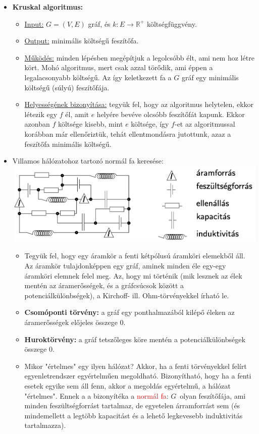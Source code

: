 \documentclass[../../szobeli.tex]{subfiles}
\begin{document}
\begin{itemize}
        \item \textbf{Kruskal algoritmus:} \begin{itemize}
            \item \underline{Input:} $G=(V,E)$ gráf, és $k:E\rightarrow \mathbb{R}^+$ költségfüggvény.
            \item \underline{Output:} minimális költségű feszítőfa.
            \item \underline{Működés:} minden lépésben megépítjuk a legolcsóbb élt, ami nem hoz létre kört. Mohó algoritmus, mert csak azzal törődik, ami éppen a legalacsonyabb költségű. Az így keletkezett fa a $G$ gráf egy minimális költségű (súlyú) feszítőfája.
            \item \underline{Helyességének bizonyítása:} tegyük fel, hogy az algoritmus helytelen, ekkor létezik egy $f$ él, amit $e$ helyére bevéve olcsóbb feszítőfát kapunk. Ekkor azonban $f$ költsége kisebb, mint $e$ költsége, így $f$-et az algoritmussal korábban már ellenőriztük, tehát ellentmondásra jutottunk, azaz a feszítőfa minimális költségű.
        \end{itemize}
        \item Villamos hálózatohoz tartozó normál fa keresése: \\ \includegraphics[scale=0.45]{./img/1.png} \begin{itemize}
            \item Tegyük fel, hogy egy áramkör a fenti kétpólusú áramköri elemekből áll. Az áramkör tulajdonképpen egy gráf, aminek minden éle egy-egy áramköri elemnek felel meg. Az, hogy mi történik (mik lesznek az élek mentén az áramerősségek, és a gráfcsúcsok között a potenciálkülönbségek), a Kirchoff- ill. Ohm-törvényekkel írható le.
            \item \textbf{Csomóponti törvény:} a gráf egy ponthalmazából kilépő éleken az áramerősségek előjeles összege 0.
            \item \textbf{Huroktörvény:} a gráf tetszőleges köre mentén a potenciálkülönbségek összege 0.
            \item Mikor "értelmes" egy ilyen hálózat? Akkor, ha a fenti törvényekkel felírt egyenletrendszer egyértelműen megoldható. Bizonyítható, hogy ha a fenti esetek egyike sem áll fenn, akkor a megoldás egyértelmű, a hálózat "értelmes". Ennek a a bizonyítéka a \textcolor{red}{normál fa}: $G$ olyan feszítőfája, ami minden feszültségforrást tartalmaz, de egyetelen árramforrást sem (és mindemellett a legtöbb kapacitást és a lehető legkevesebb induktivitás tartalmazza).

\end{itemize}
\end{itemize}
\end{document}
